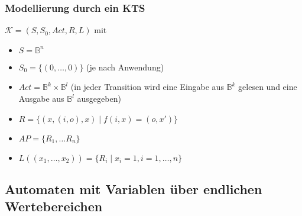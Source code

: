 \subsubsection*{Modellierung durch ein KTS}
$\mathcal{K} = (S, S_0, \textit{Act}, R, L)$ mit
\begin{itemize}
	\item $S = \mathbb{B}^n$
	\item $S_0 = \{(0, \dots, 0)\}$ (je nach Anwendung)
	\item $\textit{Act} = \mathbb{B}^k \times \mathbb{B}^l$ (in jeder Transition wird eine Eingabe aus $\mathbb{B}^k$ gelesen und eine Ausgabe aus $\mathbb{B}^l$ ausgegeben)
	\item $R = \{(x, (i,o), x) \mid f(i,x) = (o, x')\}$
	\item $AP = \{R_1, \dots R_n\}$
	\item $L\left((x_1,\dots,x_2)\right) = \{R_i \mid x_i = 1, i=1,\dots,n\}$
\end{itemize}

\nextlecture
\subsection{Automaten mit Variablen über endlichen Wertebereichen}

\cleardoubleoddemptypage